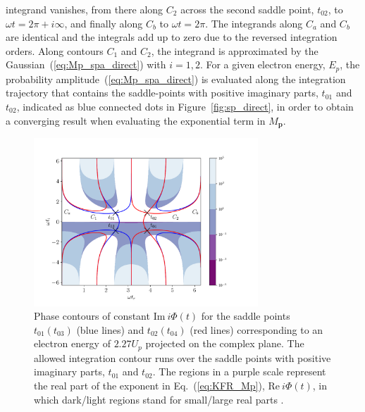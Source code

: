 integrand vanishes, from there along $C_{2}$ across the second saddle
point, $t_{02}$, to $\omega t = 2\pi + i\infty$, and finally along
$C_{b}$ to $\omega t = 2\pi$. The integrands along $C_{a}$ and $C_{b}$
are identical and the integrals add up to zero due to the reversed
integration orders. Along contours $C_{1}$ and $C_{2}$, the integrand
is approximated by the Gaussian~(\ref{eq:Mp_spa_direct}) with $i = 1,
2$. For a given electron energy, $E_{p}$, the probability
amplitude~(\ref{eq:Mp_spa_direct}) is evaluated along the integration
trajectory that contains the saddle-points with positive imaginary
parts, $t_{01}$ and $t_{02}$, indicated as blue connected dots in
Figure~\ref{fig:sp_direct}, in order to obtain a converging result
when evaluating the exponential term in $M_{\mathbf{p}}$.

\begin{figure}
  \centering
  \includegraphics[width = 0.75\textwidth]{figures/ch_ATI_SPA/direct/phase_contour12}
  \caption{Phase contours of constant $\mathrm{Im}\ i\Phi(t)$ for the
    saddle points $t_{01}(t_{03})$ (blue lines) and $t_{02}(t_{04})$
    (red lines) corresponding to an electron energy of $2.27 U_{p}$
    projected on the complex plane. The allowed integration contour
    runs over the saddle points with positive imaginary parts,
    $t_{01}$ and $t_{02}$. The regions in a purple scale represent the
    real part of the exponent in Eq.~(\ref{eq:KFR_Mp}),
    $\mathrm{Re}\ i\Phi(t)$, in which dark/light regions stand for
    small/large real parts .}
  \label{fig:sp_contours}
\end{figure}

